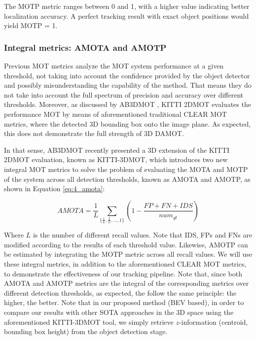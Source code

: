 The \ac{MOTP} metric ranges between 0 and 1, with a higher value indicating better localization accuracy. A perfect tracking result with exact object positions would yield \ac{MOTP} = 1.

\subsubsection{Integral metrics: AMOTA and AMOTP}
\label{subsubsec:4_integral_metrics}

Previous \ac{MOT} metrics analyze the \ac{MOT} system performance at a given threshold, not taking into account the confidence provided by the object detector and possibly misunderstanding the capability of the method. That means they do not take into account the full spectrum of precision and accuracy over different thresholds. Moreover, as discussed by AB3DMOT \cite{weng20203d}, KITTI 2DMOT evaluates the performance \ac{MOT} by means of aforementioned traditional CLEAR \ac{MOT} metrics, where the detected 3D bounding box onto the image plane. As expected, this does not demonstrate the full strength of 3D \ac{DAMOT}. 

In that sense, AB3DMOT \cite{weng2019baseline} recently presented a 3D extension of the KITTI 2DMOT evaluation, known as KITTI-3DMOT, which introduces two new integral \ac{MOT} metrics to solve the problem of evaluating the \ac{MOTA} and \ac{MOTP} of the system across all detection thresholds, known as \ac{AMOTA} and \ac{AMOTP}, as shown in Equation \ref{eq:4_amota}:

\begin{equation}
	\label{eq:4_amota}
	AMOTA = \frac{1}{L}\sum_{\{\frac{1}{L},\frac{2}{L},...,1\}}(1-\frac{FP+FN+IDS}{num_{gt}})
\end{equation}

Where $L$ is the number of different recall values. Note that \ac{IDS}, \acp{FP} and \acp{FN} are modified according to the results of each threshold value. Likewise, \ac{AMOTP} can be estimated by integrating the \ac{MOTP} metric across all recall values. We will use these integral metrics, in addition to the aforementioned CLEAR \ac{MOT} metrics, to demonstrate the effectiveness of our tracking pipeline. Note that, since both \ac{AMOTA} and \ac{AMOTP} metrics are the integral of the corresponding metrics over different detection thresholds, as expected, the follow the same principle: the higher, the better. Note that in our proposed method (\ac{BEV} based), in order to compare our results with other \ac{SOTA} approaches in the 3D space using the aforementioned KITTI-3DMOT tool, we simply retrieve $z$-information (centroid, bounding box height) from the object detection stage.

